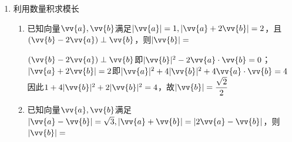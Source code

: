 \begin{enumerate}
\begin{enumerate}
        \item 若$|\vv{a}| = 3, |\vv{b}| = 4$，则向量$\vv{a} + \dfrac{3}{4}\vv{b}$与$\vv{a} - \dfrac{3}{4}\vv{b}$的位置关系是
        \begin{jieda}
            $(\vv{a} + \dfrac{3}{4}\vv{b})\cdot(\vv{a} - \dfrac{3}{4}\vv{b}) = |\vv{a}|^2 - \dfrac{9}{16}|\vv{b}|^2 = 0$
        \end{jieda}
        \item 在$\triangle ABC$中，$O$为$BC$中点，点$M,N$分别在边$AB, AC$上，且$AM = 6, MB = 4, AN = 4, NC = 3$，$\vv{OM} \cdot \vv{ON} = 0$， 则$cos A = $
        \begin{jieda}
            首先考虑以$\vv{AB}, \vv{AC}$为基底表示$\vv{OM}, \vv{ON}$：\\
            $\left \{ \begin{array}{l}
                 \vv{OM} = \vv{OA} + \vv{AM} = -\dfrac{1}{2}(\vv{AB} + \vv{AC}) + \dfrac{3}{5} \vv{AB}  \\
                 \vv{ON} = \vv{OA} + \vv{AN} = -\dfrac{1}{2}(\vv{AB} + \vv{AC}) + \dfrac{4}{7} \vv{AC}
            \end{array} \right .$ ，因此$(\dfrac{1}{10}\vv{AB} - \dfrac{1}{2}\vv{AC}) \cdot (-\dfrac{1}{2}\vv{AB} + \dfrac{1}{14}\vv{AC}) = 0$ \\
            即$\dfrac{9}{35} \vv{AB} \cdot \vv{AC} - \dfrac{1}{20}|\vv{AB}|^2 - \dfrac{1}{28}|\vv{AC}|^2 = 0$，代入$|\vv{AB}| = 10, |\vv{AC}| = 7$，得到$cos A = \dfrac{3}{8}$
        \end{jieda}
    \end{enumerate}
    \item 利用数量积求模长
    \begin{enumerate}
        \item 已知向量$\vv{a}, \vv{b}$满足$|\vv{a}| = 1, |\vv{a} + 2\vv{b}| = 2$，且$(\vv{b} - 2\vv{a}) \perp \vv{b}$，则$|\vv{b}| = $ 
        \begin{jieda}
            $(\vv{b} - 2\vv{a}) \perp \vv{b}$即$|\vv{b}|^2 - 2\vv{a} \cdot \vv{b} = 0$；$|\vv{a} + 2\vv{b}| = 2$即$|\vv{a}|^2 + 4|\vv{b}|^2 + 4\vv{a}\cdot\vv{b} = 4$ \\
            因此$1 + 4|\vv{b}|^2 + 2|\vv{b}|^2 = 4$，故$|\vv{b}| = \dfrac{\sqrt{2}}{2}$
        \end{jieda}
        \item 已知向量$\vv{a}, \vv{b}$满足$|\vv{a} - \vv{b}| = \sqrt{3}, |\vv{a} + \vv{b}| = |2\vv{a} - \vv{b}|$，则$|\vv{b}| = $ 

\end{enumerate}
\end{enumerate}
